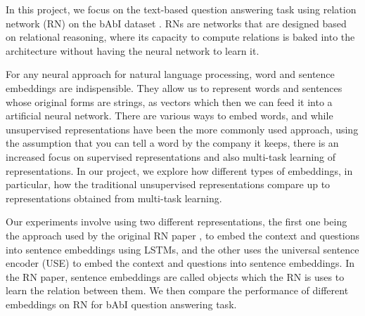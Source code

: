 \documentclass{article}
\begin{document}

In this project, we focus on the text-based question answering task using relation network (RN) \cite{Santoro2017} on the bAbI dataset \cite{Weston2015}. RNs are networks that are designed based on relational reasoning, where its capacity to compute relations is baked into the architecture without having the neural network to learn it. 

For any neural approach for natural language processing, word and sentence embeddings are indispensible. They allow us to represent words and sentences whose original forms are strings, as vectors which then we can feed it into a artificial neural network. There are various ways to embed words, and while unsupervised representations have been the more commonly used approach, using the assumption that you can tell a word by the company it keeps, there is an increased focus on supervised representations and also multi-task learning of representations. In our project, we explore how different types of embeddings, in particular, how the traditional unsupervised representations compare up to representations obtained from multi-task learning.





Our experiments involve using two different representations, the first one being the approach used by the original RN paper \cite{Santoro2017}, to embed the context and questions into sentence embeddings using LSTMs, and the other uses the universal sentence encoder (USE) \cite{Cer2018} to embed the context and questions into sentence embeddings. In the RN paper, sentence embeddings are  called objects which the RN is uses to learn the relation between them. We then compare the performance of different embeddings on RN for bAbI question answering task.


\end{document}
